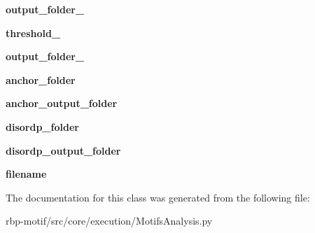 \begin{DoxyCompactItemize}
\item 
\hypertarget{classsrc_1_1core_1_1execution_1_1MotifsAnalysis_1_1MotifsAnalysis_abc5cbe67b9845b781f2f9874d979103b}{{\bfseries output\-\_\-folder\-\_}}\label{classsrc_1_1core_1_1execution_1_1MotifsAnalysis_1_1MotifsAnalysis_abc5cbe67b9845b781f2f9874d979103b}

\item 
\hypertarget{classsrc_1_1core_1_1execution_1_1MotifsAnalysis_1_1MotifsAnalysis_a414b5c32c2f94f58b0008d5b721722c5}{{\bfseries threshold\-\_}}\label{classsrc_1_1core_1_1execution_1_1MotifsAnalysis_1_1MotifsAnalysis_a414b5c32c2f94f58b0008d5b721722c5}

\item 
\hypertarget{classsrc_1_1core_1_1execution_1_1MotifsAnalysis_1_1MotifsAnalysis_a0f512cfa4fb37e3df75c0dbacef970e6}{{\bfseries output\-\_\-folder\-\_}}\label{classsrc_1_1core_1_1execution_1_1MotifsAnalysis_1_1MotifsAnalysis_a0f512cfa4fb37e3df75c0dbacef970e6}

\item 
\hypertarget{classsrc_1_1core_1_1execution_1_1MotifsAnalysis_1_1MotifsAnalysis_adc404243a06030af2244276f5d4aedb5}{{\bfseries anchor\-\_\-folder}}\label{classsrc_1_1core_1_1execution_1_1MotifsAnalysis_1_1MotifsAnalysis_adc404243a06030af2244276f5d4aedb5}

\item 
\hypertarget{classsrc_1_1core_1_1execution_1_1MotifsAnalysis_1_1MotifsAnalysis_a32c2512f970ae49ef65f19489ed11562}{{\bfseries anchor\-\_\-output\-\_\-folder}}\label{classsrc_1_1core_1_1execution_1_1MotifsAnalysis_1_1MotifsAnalysis_a32c2512f970ae49ef65f19489ed11562}

\item 
\hypertarget{classsrc_1_1core_1_1execution_1_1MotifsAnalysis_1_1MotifsAnalysis_a0cc33128ee420f0d0d7c0fb86a61e04d}{{\bfseries disordp\-\_\-folder}}\label{classsrc_1_1core_1_1execution_1_1MotifsAnalysis_1_1MotifsAnalysis_a0cc33128ee420f0d0d7c0fb86a61e04d}

\item 
\hypertarget{classsrc_1_1core_1_1execution_1_1MotifsAnalysis_1_1MotifsAnalysis_aaea8e4550bc755a287d6278cb51706c7}{{\bfseries disordp\-\_\-output\-\_\-folder}}\label{classsrc_1_1core_1_1execution_1_1MotifsAnalysis_1_1MotifsAnalysis_aaea8e4550bc755a287d6278cb51706c7}

\item 
\hypertarget{classsrc_1_1core_1_1execution_1_1MotifsAnalysis_1_1MotifsAnalysis_abea642e7c0b38aaab25e4d02794abaf4}{{\bfseries filename}}\label{classsrc_1_1core_1_1execution_1_1MotifsAnalysis_1_1MotifsAnalysis_abea642e7c0b38aaab25e4d02794abaf4}

\end{DoxyCompactItemize}


The documentation for this class was generated from the following file\-:\begin{DoxyCompactItemize}
\item 
rbp-\/motif/src/core/execution/Motifs\-Analysis.\-py\end{DoxyCompactItemize}
